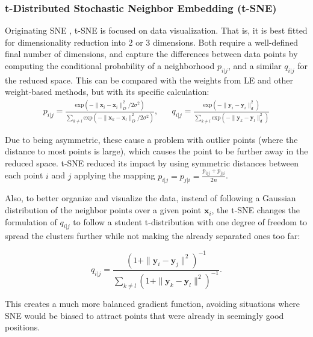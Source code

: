         \subsubsection{t-Distributed Stochastic Neighbor Embedding (t-SNE)}
            Originating SNE \cite{sne}, \ac{t-SNE} \cite{t-sne} is focused on data visualization. That is, it is best fitted for dimensionality reduction into 2 or 3 dimensions. Both require a well-defined final number of dimensions, and capture the differences between data points by computing the conditional probability of a neighborhood $p_{i|j}$, and a similar $q_{i|j}$ for the reduced space. This can be compared with the weights from LE and other weight-based methods, but with its specific calculation:
            \begin{align}
                p_{i|j} = \frac{\text{exp}(-\|\boldsymbol{x}_i-\boldsymbol{x}_i\|_D^2/2\sigma^2)}{\sum_{k\neq l}\text{exp}\left(-\| \boldsymbol{x}_k - \boldsymbol{x}_l \|_D^2/2\sigma^2 \right)}, &&
                q_{i|j} = \frac{\text{exp}(-\|\boldsymbol{y}_i-\boldsymbol{y}_i\|_d^2)}{\sum_{k\neq l}\text{exp}\left(-\| \boldsymbol{y}_k - \boldsymbol{y}_l \|_d^2 \right)}
            \end{align}
            
            Due to being asymmetric, these cause a problem with outlier points (where the distance to most points is large), which causes the point to be further away in the reduced space. \ac{t-SNE} reduced its impact by using symmetric distances between each point $i$ and $j$ applying the mapping $p_{i|j} = p_{j|i} = \frac{p_{i|j} + p_{j|i}}{2n}$.

            Also, to better organize and visualize the data, instead of following a Gaussian distribution of the neighbor points over a given point $\boldsymbol{x}_i$, the \ac{t-SNE} changes the formulation of $q_{i|j}$ to follow a student t-distribution with one degree of freedom to spread the clusters further while not making the already separated ones too far:
            
            \begin{equation}
                q_{i|j} = \frac{(1+\| \boldsymbol{y}_i - \boldsymbol{y}_j \|^2)^{-1}}{\sum_{k\neq l} (1+\| \boldsymbol{y}_k - \boldsymbol{y}_l \|^2)^{-1}}.
            \end{equation}
            
            This creates a much more balanced gradient function, avoiding situations where SNE would be biased to attract points that were already in seemingly good positions. 

